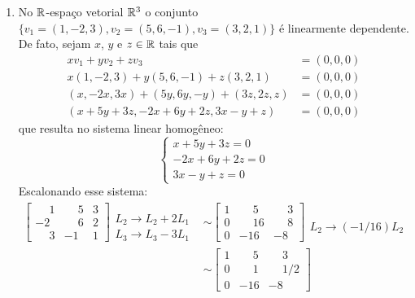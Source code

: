 \begin{exemplos}
\begin{enumerate}
    \item No $\mathbb{R}$-espaço vetorial $\mathbb{R}^3$ o conjunto $\{v_1 = (1, -2, 3), v_2 = (5, 6, -1), v_3 = (3, 2, 1)\}$ é linearmente dependente. De fato,
      sejam $x$, $y$ e $z \in \mathbb{R}$ tais que
      \begin{align*}
        xv_1 + yv_2 + zv_3 &= (0, 0, 0)\\
        x(1, -2, 3) + y(5, 6, -1) + z(3, 2, 1) &= (0, 0, 0)\\
        (x, -2x, 3x) + (5y, 6y, -y) + (3z, 2z, z) &= (0, 0, 0)\\
        (x + 5y + 3z, -2x + 6y + 2z, 3x - y + z) &= (0, 0, 0)
      \end{align*}
      que resulta no sistema linear homogêneo:
      \[
        \begin{cases}
          x + 5y + 3z = 0\\
          -2x + 6y + 2z = 0\\
          3x - y + z = 0
        \end{cases}
      \]
      Escalonando esse sistema:
      \begin{align*}
        \begin{bmatrix}
          \phantom{-} 1 & \phantom{-} 5 & 3\\
          -2 & \phantom{-} 6 & 2\\
          \phantom{-} 3 & -1 & 1
        \end{bmatrix}
        \begin{array}{l}
          \phantom{x}\\L_2 \to L_2 + 2L_1\\L_3 \to L_3 - 3L_1
        \end{array}&\sim
        \begin{bmatrix}
          1 & \phantom{-} 5 & \phantom{-} 3\\
          0 & \phantom{-} 16 & \phantom{-} 8\\
          0 & -16 & -8
        \end{bmatrix}
        \begin{array}{l}
          \phantom{x}\\L_2 \to (-1/16)L_2\phantom{x}
        \end{array}\\&\sim
        \begin{bmatrix}
          1 & \phantom{-} 5 & \phantom{-} 3\\
          0 & \phantom{-} 1 & \phantom{-} 1/2\\
          0 & -16 & -8
        \end{bmatrix}

\end{align*}
\end{enumerate}
\end{exemplos}
